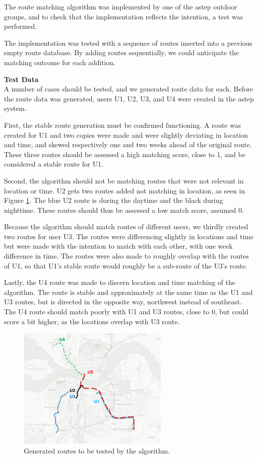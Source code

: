 The route matching algorithm was implemented by one of the \gls{astep} outdoor groups, and to check that the implementation reflects the intention, a test was performed.

The implementation was tested with a sequence of routes inserted into a previous empty route database.
By adding routes sequentially, we could anticipate the matching outcome for each addition.


\textbf{Test Data}\\
A number of cases should be tested, and we generated route data for each. 
Before the route data was generated, users U1, U2, U3, and U4 were created in the \gls{astep} system.

First, the stable route generation must be confirmed functioning.
A route was created for U1 and two copies were made and were slightly deviating in location and time, and skewed respectively one and two weeks ahead of the original route.
These three routes should be assessed a high matching score, close to 1, and be considered a stable route for U1.

Second, the algorithm should not be matching routes that were not relevant in location or time.
U2 gets two routes added not matching in location, as seen in Figure \ref{fig:algroutes}.
The blue U2 route is during the daytime and the black during nighttime.
These routes should thus be assessed a low match score, assumed 0.

Because the algorithm should match routes of different users, we thirdly created two routes for user U3.
The routes were differencing slightly in locations and time but were made with the intention to match with each other, with one week difference in time.
The routes were also made to roughly overlap with the routes of U1, so that U1's stable route would roughly be a sub-route of the U3's route.

Lastly, the U4 route was made to discern location and time matching of the algorithm.
The route is stable and approximately at the same time as the U1 and U3 routes, but is directed in the opposite way, northwest instead of southeast.
The U4 route should match poorly with U1 and U3 routes, close to 0, but could score a bit higher, as the locations overlap with U3 route.

\begin{figure}[h]
	\centering
	\includegraphics[width=0.65\textwidth]{figures/algorithmroutes.png}
	\caption{Generated routes to be tested by the algorithm.}
	\label{fig:algroutes}
\end{figure}


